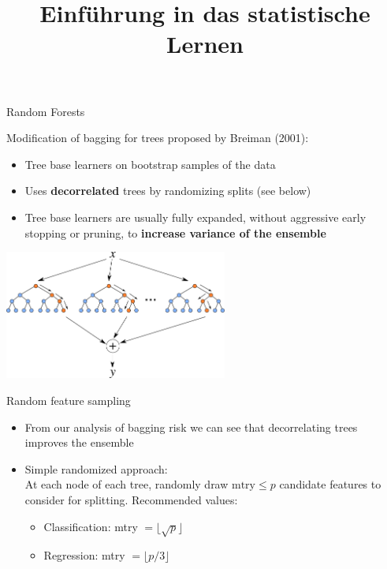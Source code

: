 \documentclass[11pt,compress,t,notes=noshow, xcolor=table]{beamer}
\title{Einführung in das statistische Lernen}
\institute{\href{https://compstat-lmu.github.io/lecture_i2ml/}{compstat-lmu.github.io/lecture\_i2ml}}
\date{}
\begin{document}









\sloppy

\begin{vbframe}{Random Forests}

Modification of bagging for trees proposed by Breiman (2001):

\begin{itemize}
  \item Tree base learners on bootstrap samples of the data
  \item Uses \textbf{decorrelated} trees by randomizing splits (see below)
  \item Tree base learners are usually fully expanded, without aggressive early stopping or
    pruning, to \textbf{increase variance of the ensemble}
\end{itemize}
\begin{center}
\includegraphics[width=0.55\textwidth]{figure_man/forest.png}
\end{center}
\end{vbframe}



\begin{vbframe}{Random feature sampling}

\begin{itemize}
  \item From our analysis of bagging risk we can see that decorrelating trees improves the ensemble
  \item Simple randomized approach:\\
    At each node of each tree, randomly draw $\text{mtry} \le p$ candidate features to consider for splitting. Recommended values:
  \begin{itemize}
    \item Classification: mtry $ = \lfloor \sqrt{p} \rfloor$
    \item Regression: mtry $ = \lfloor p/3 \rfloor$
  \end{itemize}
\end{itemize}
\end{vbframe}
\end{document}

